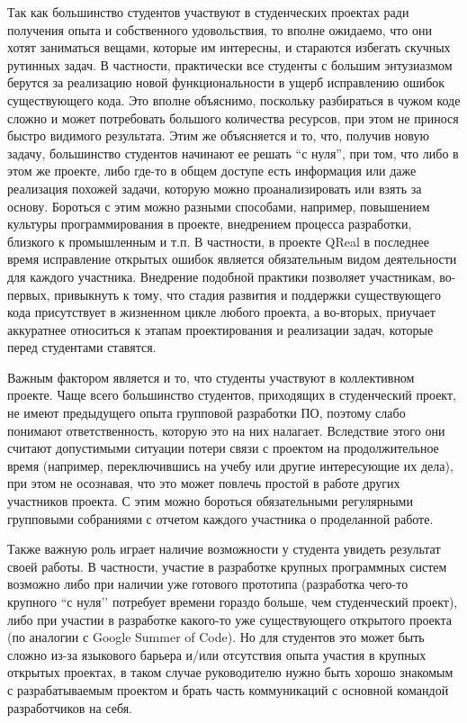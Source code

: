 \documentclass[a5paper]{article}
\begin{document}
Так как большинство студентов участвуют в студенческих проектах ради получения опыта и собственного удовольствия, то вполне ожидаемо, что они хотят заниматься вещами, которые им интересны, и стараются избегать скучных рутинных задач. В частности, практически все студенты  с большим энтузиазмом берутся за реализацию новой функциональности в ущерб исправлению ошибок существующего кода. Это вполне объяснимо, поскольку разбираться в чужом коде сложно и может потребовать большого количества ресурсов, при этом не принося быстро видимого результата. Этим же объясняется и то, что, получив новую задачу, большинство студентов начинают ее решать “с нуля”, при том, что либо в этом же проекте, либо где-то в общем доступе есть информация или даже реализация похожей задачи, которую можно проанализировать или взять за основу. Бороться с этим можно разными способами, например, повышением культуры программирования в проекте, внедрением процесса разработки, близкого к промышленным и т.п. В частности, в проекте QReal в последнее время исправление открытых ошибок является обязательным видом деятельности для каждого участника. Внедрение подобной практики позволяет участникам, во-первых, привыкнуть к тому, что стадия развития и поддержки существующего кода присутствует в жизненном цикле любого проекта, а во-вторых, приучает аккуратнее относиться к этапам проектирования и реализации задач, которые перед студентами ставятся.

Важным фактором является и то, что студенты участвуют в коллективном проекте. Чаще всего большинство студентов, приходящих в студенческий проект, не имеют предыдущего опыта групповой разработки ПО, поэтому слабо понимают ответственность, которую это на них налагает. Вследствие этого они считают допустимыми ситуации потери связи с проектом на продолжительное время (например, переключившись на учебу или другие интересующие их дела), при этом не осознавая, что это может повлечь простой в работе других участников проекта. С этим можно бороться обязательными регулярными групповыми собраниями с отчетом каждого участника о проделанной работе. 

Также важную роль играет наличие возможности у студента увидеть результат своей работы. В частности, участие в разработке крупных программных систем возможно либо при наличии уже готового прототипа (разработка чего-то крупного ``с нуля’’ потребует времени гораздо больше, чем студенческий проект), либо при участии в разработке какого-то уже существующего открытого проекта (по аналогии с Google Summer of Code). Но для студентов это может быть сложно из-за языкового барьера и/или отсутствия опыта участия в крупных открытых проектах, в таком случае руководителю нужно быть хорошо знакомым с разрабатываемым проектом и брать часть коммуникаций с основной командой разработчиков на себя. 
\end{document}
